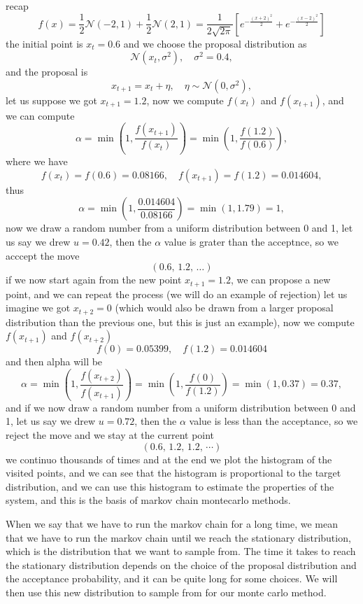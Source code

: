 \begin{example}
    recap
    \[
        f(x) = \frac{1}{2} \mathcal{N}(-2, 1) + \frac{1}{2} \mathcal{N}(2, 1) = \frac{1}{2 \sqrt{2 \pi}} \left[ e^{- \frac{(x+2)^2}{2}} + e^{- \frac{(x-2)^2}{2}} \right]
    \]
    the initial point is \(x_t = 0.6\) and we choose the proposal distribution as
    \[
        \mathcal{N}(x_t, \sigma^2), \quad \sigma^2 = 0.4,
    \]
    and the proposal is
    \[
        x_{t+1} = x_t + \eta, \quad \eta \sim \mathcal{N}(0, \sigma^2),
    \]
    let us suppose we got \(x_{t+1} = 1.2\), now we compute \(f(x_t)\) and \(f(x_{t+1})\), and we can compute
    \[
        \alpha = \min \left( 1, \frac{f(x_{t+1})}{f(x_t)} \right) = \min \left( 1, \frac{f(1.2)}{f(0.6)} \right),
    \]
    where we have
    \[
        f(x_t) = f(0.6) = 0.08166, \quad f(x_{t+1}) = f(1.2) = 0.014604,
    \]
    thus
    \[
        \alpha = \min \left( 1, \frac{0.014604}{0.08166} \right) = \min(1, 1.79) = 1,
    \]
    now we draw a random number from a uniform distribution between 0 and 1, let us say we drew \(u = 0.42\), then the \(\alpha\) value is grater than the acceptnce, so we acccept the move
    \[
        \left(0.6,\,1.2,\,\dots \right)
    \]
    if we now start again from the new point \(x_{t+1} = 1.2\), we can propose a new point, and we can repeat the process (we will do an example of rejection)
    let us imagine we got \(x_{t+2} = 0\) (which would also be drawn from a larger proposal distribution than the previous one, but this is just an example), now we compute \(f(x_{t+1})\) and \(f(x_{t+2})\)
    \[
        f(0) = 0.05399, \quad f(1.2) = 0.014604
    \]
    and then alpha will be
    \[
        \alpha = \min \left( 1, \frac{f(x_{t+2})}{f(x_{t+1})} \right) = \min \left( 1, \frac{f(0)}{f(1.2)} \right) = \min \left( 1, 0.37 \right) = 0.37,
    \]
    and if we now draw a random number from a uniform distribution between 0 and 1, let us say we drew \(u = 0.72\), then the \(\alpha\) value is less than the acceptance, so we reject the move and we stay at the current point
    \[
        \left(0.6,\, 1.2,\, 1.2,\,\cdots\right)
    \]
    we continuo thousands of times and at the end we plot the histogram of the visited points, and we can see that the histogram is proportional to the target distribution, and we can use this histogram to estimate the properties of the system, and this is the basis of markov chain montecarlo methods.

    When we say that we have to run the markov chain for a long time, we mean that we have to run the markov chain until we reach the stationary distribution, which is the distribution that we want to sample from. The time it takes to reach the stationary distribution depends on the choice of the proposal distribution and the acceptance probability, and it can be quite long for some choices. We will then use this new distribution to sample from for our monte carlo method.
\end{example}

